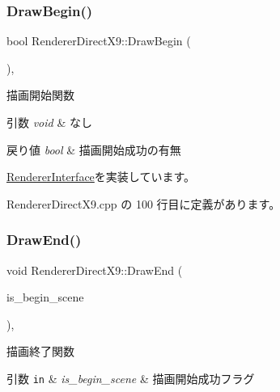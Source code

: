 \subsubsection{\texorpdfstring{Draw\+Begin()}{DrawBegin()}}
{\footnotesize\ttfamily bool Renderer\+Direct\+X9\+::\+Draw\+Begin (\begin{DoxyParamCaption}{ }\end{DoxyParamCaption})\hspace{0.3cm}{\ttfamily [override]}, {\ttfamily [virtual]}}



描画開始関数 


\begin{DoxyParams}{引数}
{\em void} & なし \\
\hline
\end{DoxyParams}

\begin{DoxyRetVals}{戻り値}
{\em bool} & 描画開始成功の有無 \\
\hline
\end{DoxyRetVals}


\mbox{\hyperlink{class_renderer_interface_a86a487deb4e4207a67410d00ec670fd7}{Renderer\+Interface}}を実装しています。



 Renderer\+Direct\+X9.\+cpp の 100 行目に定義があります。

\mbox{\label{class_renderer_direct_x9_a5f934597020f77dc9cf729acfb13a830}} 
\subsubsection{\texorpdfstring{Draw\+End()}{DrawEnd()}}
{\footnotesize\ttfamily void Renderer\+Direct\+X9\+::\+Draw\+End (\begin{DoxyParamCaption}\item[{bool}]{is\+\_\+begin\+\_\+scene }\end{DoxyParamCaption})\hspace{0.3cm}{\ttfamily [override]}, {\ttfamily [virtual]}}



描画終了関数 


\begin{DoxyParams}[1]{引数}
\mbox{\tt in}  & {\em is\+\_\+begin\+\_\+scene} & 描画開始成功フラグ \\
\hline
\end{DoxyParams}

